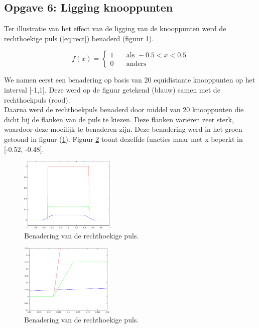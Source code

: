 \documentclass[a4paper]{article}
\newcommand{\opgave}[1]{\subsection{Opgave #1}}
\begin{document}
\opgave{6: Ligging knooppunten}\label{sec:oef6}
Ter illustratie van het effect van de ligging van de knooppunten werd de rechthoekige puls (\ref{eq:rect}) benaderd (figuur  \ref{fig:rectan}).

\begin{equation}
f(x) =
  \begin{cases}
    1       & \quad \text{als } -0.5 < x < 0.5\\
    0  & \quad \text{anders }
  \end{cases}
  \label{eq:rect}
\end{equation}

We namen eerst een benadering op basis van 20 equidistante knooppunten op het interval [-1,1]. Deze werd op de figuur getekend (blauw) samen met de rechthoekpuls (rood). \\

Daarna werd de rechthoekpuls benaderd door middel van 20 knooppunten die dicht bij de flanken van de puls te kiezen. Deze flanken vari\"eren zeer sterk, waardoor deze moeilijk te benaderen zijn. Deze benadering werd in het groen getoond in figuur (\ref{fig:rectan}). Figuur \ref{fig:rectanZoom} toont dezelfde functies maar met x beperkt in [-0.52, -0.48]. \\

\begin{figure}[H]
	\begin{center} 
		\includegraphics[width=0.4\textwidth]{Rectan.eps}
	\end{center}
	\caption{Benadering van de rechthoekige puls.}
	\label{fig:rectan}
\end{figure}

\begin{figure}[H]
	\begin{center} 
		\includegraphics[width=0.4\textwidth]{RectanZoom.eps}
	\end{center}
	\caption{Benadering van de rechthoekige puls.}
	\label{fig:rectanZoom}
\end{figure}
\newpage
\end{document}
